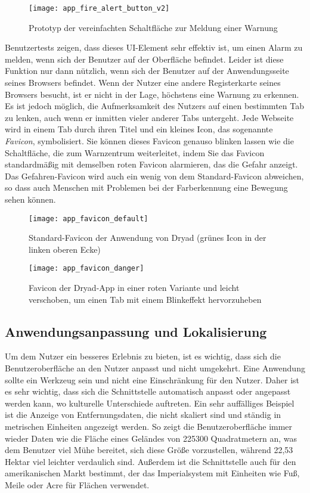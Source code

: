 \begin{figure}[H]
  \centering
  \texttt{[image: app\_fire\_alert\_button\_v2]}
  \caption{Prototyp der vereinfachten Schaltfläche zur Meldung einer Warnung}
  \label{fig:app_fire_alert_button_v2}
\end{figure}

Benutzertests zeigen, dass dieses \ac{UI}-Element sehr effektiv ist, um einen Alarm zu melden, wenn sich der Benutzer auf der Oberfläche befindet.
Leider ist diese Funktion nur dann nützlich, wenn sich der Benutzer auf der Anwendungsseite seines Browsers befindet.
Wenn der Nutzer eine andere Registerkarte seines Browsers besucht, ist er nicht in der Lage, höchstens eine Warnung zu erkennen.
Es ist jedoch möglich, die Aufmerksamkeit des Nutzers auf einen bestimmten Tab zu lenken, auch wenn er inmitten vieler anderer Tabs untergeht.
Jede Webseite wird in einem Tab durch ihren Titel und ein kleines Icon, das sogenannte \textit{Favicon}, symbolisiert.
Sie können dieses Favicon genauso blinken lassen wie die Schaltfläche, die zum Warnzentrum weiterleitet, indem Sie das Favicon standardmäßig mit demselben roten Favicon alarmieren, das die Gefahr anzeigt.
Das Gefahren-Favicon wird auch ein wenig von dem Standard-Favicon abweichen, so dass auch Menschen mit Problemen bei der Farberkennung eine Bewegung sehen können.

\begin{figure}[H]
  \centering
  \texttt{[image: app\_favicon\_default]}
  \caption{Standard-Favicon der Anwendung von Dryad (grünes Icon in der linken oberen Ecke)}
  \label{fig:app_favicon_default}
\end{figure}

\begin{figure}[H]
  \centering
  \texttt{[image: app\_favicon\_danger]}
  \caption{Favicon der Dryad-App in einer roten Variante und leicht verschoben, um einen Tab mit einem Blinkeffekt hervorzuheben}
  \label{fig:app_favicon_danger}
\end{figure}

\subsection{Anwendungsanpassung und Lokalisierung} \label{sec:conceptionLocale}
Um dem Nutzer ein besseres Erlebnis zu bieten, ist es wichtig, dass sich die Benutzeroberfläche an den Nutzer anpasst und nicht umgekehrt.
Eine Anwendung sollte ein Werkzeug sein und nicht eine Einschränkung für den Nutzer.
Daher ist es sehr wichtig, dass sich die Schnittstelle automatisch anpasst oder angepasst werden kann, wo kulturelle Unterschiede auftreten.
Ein sehr auffälliges Beispiel ist die Anzeige von Entfernungsdaten, die nicht skaliert sind und ständig in metrischen Einheiten angezeigt werden.
So zeigt die Benutzeroberfläche immer wieder Daten wie die Fläche eines Geländes von 225300 Quadratmetern an, was dem Benutzer viel Mühe bereitet, sich diese Größe vorzustellen, während 22,53 Hektar viel leichter verdaulich sind.
Außerdem ist die Schnittstelle auch für den amerikanischen Markt bestimmt, der das Imperialsystem mit Einheiten wie Fuß, Meile oder Acre für Flächen verwendet.

